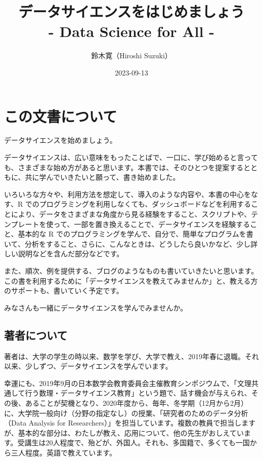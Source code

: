 \documentclass[
  xelatex, ja=standard]{bxjsbook}
\title{データサイエンスをはじめましょう\\
- Data Science for All -}
\author{鈴木寛（Hiroshi Suzuki）}
\date{2023-09-13}
\theoremstyle{definition}
\theoremstyle{definition}
\theoremstyle{definition}
\theoremstyle{definition}
\theoremstyle{remark}
\begin{document}
\maketitle

{
\setcounter{tocdepth}{1}
\tableofcontents
}
\hypertarget{ux3053ux306eux6587ux66f8ux306bux3064ux3044ux3066}{%
\chapter*{この文書について}\label{ux3053ux306eux6587ux66f8ux306bux3064ux3044ux3066}}

データサイエンスを始めましょう。

データサイエンスは、広い意味をもったことばで、一口に、学び始めると言っても、さまざまな始め方があると思います。本書では、そのひとつを提案するとともに、共に学んでいきたいと願って、書き始めました。

いろいろな方々や、利用方法を想定して、導入のような内容や、本書の中心をなす、R でのプログラミングを利用しなくても、ダッシュボードなどを利用することにより、データをさまざまな角度から見る経験をすること、スクリプトや、テンプレートを使って、一部を置き換えることで、データサイエンスを経験すること、基本的な R でのプログラミングを学んで、自分で、簡単なプログラムを書いて、分析をすること、さらに、こんなときは、どうしたら良いかなど、少し詳しい説明などを含んだ部分などです。

また、順次、例を提供する、ブログのようなものも書いていきたいと思います。この書を利用するために「データサイエンスを教えてみませんか」と、教える方のサポートも、書いていく予定です。

みなさんも一緒にデータサイエンスを学んでみませんか。

\hypertarget{ux8457ux8005ux306bux3064ux3044ux3066}{%
\section*{著者について}\label{ux8457ux8005ux306bux3064ux3044ux3066}}

著者は、大学の学生の時以来、数学を学び、大学で教え、2019年春に退職。それ以来、少しずつ、データサイエンスを学んでいます。

幸運にも、2019年9月の日本数学会教育委員会主催教育シンポジウムで、「文理共通して行う数理・データサイエンス教育」という題で、話す機会が与えられ、その後、あることが契機となり、2020年度から、毎年、冬学期（12月から2月）に、大学院一般向け（分野の指定なし）の授業、「研究者のためのデータ分析（Data Analysis for Researchers）」を担当しています。複数の教員で担当しますが、基本的な部分は、わたしが教え、応用について、他の先生がおしえています。受講生は20人程度で、殆どが、外国人。それも、多国籍で、多くても一国から三人程度。英語で教えています。
\end{document}
